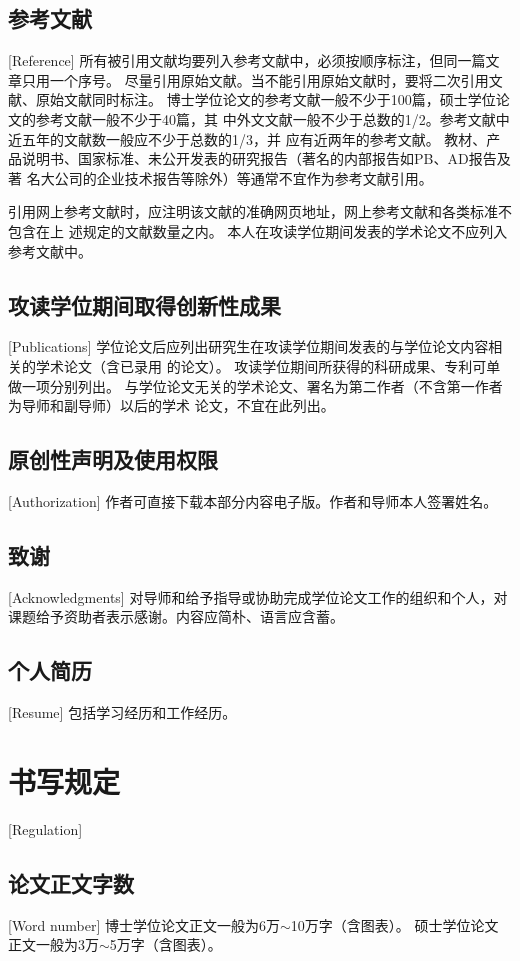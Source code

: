 \subsection{参考文献}[Reference]
所有被引用文献均要列入参考文献中，必须按顺序标注，但同一篇文章只用一个序号。
尽量引用原始文献。当不能引用原始文献时，要将二次引用文献、原始文献同时标注。
博士学位论文的参考文献一般不少于100篇，硕士学位论文的参考文献一般不少于40篇，其
中外文文献一般不少于总数的1/2。参考文献中近五年的文献数一般应不少于总数的1/3，并
应有近两年的参考文献。
教材、产品说明书、国家标准、未公开发表的研究报告（著名的内部报告如PB、AD报告及著
名大公司的企业技术报告等除外）等通常不宜作为参考文献引用。

引用网上参考文献时，应注明该文献的准确网页地址，网上参考文献和各类标准不包含在上
述规定的文献数量之内。
本人在攻读学位期间发表的学术论文不应列入参考文献中。

\subsection{攻读学位期间取得创新性成果}[Publications]
学位论文后应列出研究生在攻读学位期间发表的与学位论文内容相关的学术论文（含已录用
的论文）。
攻读学位期间所获得的科研成果、专利可单做一项分别列出。
与学位论文无关的学术论文、署名为第二作者（不含第一作者为导师和副导师）以后的学术
论文，不宜在此列出。

\subsection{原创性声明及使用权限}[Authorization]
作者可直接下载本部分内容电子版。作者和导师本人签署姓名。

\subsection{致谢}[Acknowledgments]
对导师和给予指导或协助完成学位论文工作的组织和个人，对课题给予资助者表示感谢。内容应简朴、语言应含蓄。

\subsection{个人简历}[Resume]
包括学习经历和工作经历。

\section{书写规定}[Regulation]
\subsection{论文正文字数}[Word number]
博士学位论文正文一般为6万$\sim$10万字（含图表）。
硕士学位论文正文一般为3万$\sim$5万字（含图表）。
